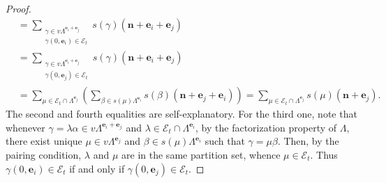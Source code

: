 \documentclass[10pt,a4paper]{amsart}
\newcommand{\N}{\mathbf{n}}
\begin{document}
\begin{proof}
\begin{align*}
&= \displaystyle{\sum_{\substack{\gamma\in v\Lambda^{\mathbf{e}_i+\mathbf{e}_j}\\\gamma(0,\mathbf{e}_i)\in \mathcal{E}_t}}} s(\gamma)(\N+\mathbf{e}_i+\mathbf{e}_j)\\
&= \displaystyle{\sum_{\substack{\gamma\in v\Lambda^{\mathbf{e}_i+\mathbf{e}_j}\\\gamma(0,\mathbf{e}_j)\in \mathcal{E}_t}}} s(\gamma)(\N+\mathbf{e}_i+\mathbf{e}_j)\\
&= \displaystyle{\sum_{\mu\in \mathcal{E}_t\cap \Lambda^{\mathbf{e}_j}}} \left(\displaystyle{\sum_{\beta\in s(\mu)\Lambda^{\mathbf{e}_i}}} s(\beta)(\N+\mathbf{e}_j+\mathbf{e}_i)\right)=\displaystyle{\sum_{\mu\in \mathcal{E}_t\cap \Lambda^{\mathbf{e}_j}}} s(\mu)(\N+\mathbf{e}_j).
\end{align*}
The second and fourth equalities are self-explanatory. For the third one, note that whenever $\gamma=\lambda\alpha\in v\Lambda^{\mathbf{e}_i+\mathbf{e}_j}$ and $\lambda\in \mathcal{E}_t\cap \Lambda^{\mathbf{e}_i}$, by the factorization property of $\Lambda$, there exist unique $\mu\in v\Lambda^{\mathbf{e}_j}$ and $\beta\in s(\mu)\Lambda^{\mathbf{e}_i}$ such that $\gamma=\mu\beta$. Then, by the pairing condition, $\lambda$ and $\mu$ are in the same partition set, whence $\mu\in \mathcal{E}_t$. Thus $\gamma(0,\mathbf{e}_i)\in \mathcal{E}_t$ if and only if $\gamma(0,\mathbf{e}_j)\in \mathcal{E}_t$. 


\end{proof}
\end{document}

